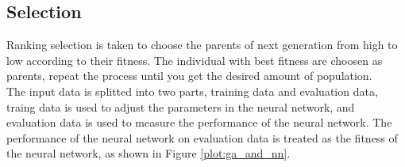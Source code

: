 \documentclass[smallextended]{svjour3}       %
\begin{document}
\begin{multicols}{2}
\begin{center}
\label{plot:neural_network_model_example}
\end{center}

\subsection{Selection}
Ranking selection is taken to choose the parents of next generation from high to
low according to their fitness. The individual with best fitness are choosen as
parents, repeat the process until you get the desired amount of population. \\

  The input data is splitted into two parts, training data and evaluation data,
traing data is used to adjust the parameters in the neural network, and
evaluation data is used to measure the performance of the neural network. The
performance of the neural network on evaluation data is treated as the fitness
of the neural network, as shown in Figure \ref{plot:ga_and_nn}.


\end{multicols}
\end{document}
